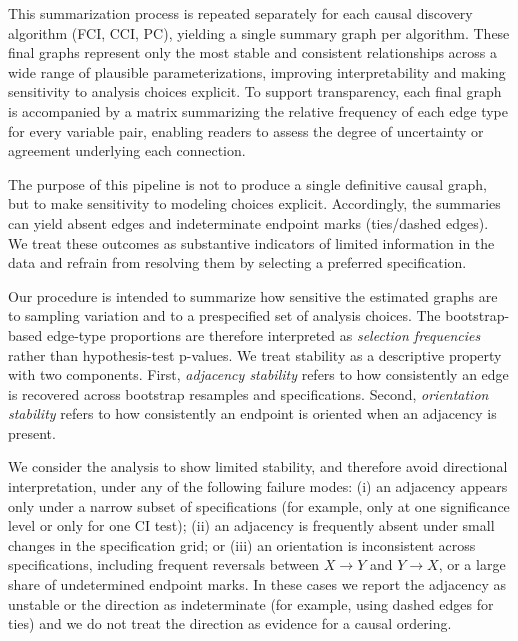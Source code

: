 \documentclass[
]{article}
\begin{document}
This summarization process is repeated separately for each causal
discovery algorithm (FCI, CCI, PC),
\textcolor{BrickRed}{yielding a single summary graph per algorithm. These final graphs represent only the most stable and consistent relationships across a wide range of plausible parameterizations, improving interpretability and making sensitivity to analysis choices explicit.}
To support transparency, each final graph is accompanied by a matrix
summarizing the relative frequency of each edge type for every variable
pair, enabling readers to assess the degree of uncertainty or agreement
underlying each connection.

\textcolor{BrickRed}{The purpose of this pipeline is not to produce a single definitive causal graph, but to make sensitivity to modeling choices explicit. Accordingly, the summaries can yield absent edges and indeterminate endpoint marks (ties/dashed edges). We treat these outcomes as substantive indicators of limited information in the data and refrain from resolving them by selecting a preferred specification.}

\textcolor{BrickRed}{Our procedure is intended to summarize how sensitive the estimated graphs are to sampling variation and to a prespecified set of analysis choices. The bootstrap-based edge-type proportions are therefore interpreted as \emph{selection frequencies} rather than hypothesis-test p-values. We treat stability as a descriptive property with two components. First, \emph{adjacency stability} refers to how consistently an edge is recovered across bootstrap resamples and specifications. Second, \emph{orientation stability} refers to how consistently an endpoint is oriented when an adjacency is present.}

\textcolor{BrickRed}{We consider the analysis to show limited stability, and therefore avoid directional interpretation, under any of the following failure modes: (i) an adjacency appears only under a narrow subset of specifications (for example, only at one significance level or only for one CI test); (ii) an adjacency is frequently absent under small changes in the specification grid; or (iii) an orientation is inconsistent across specifications, including frequent reversals between $X \rightarrow Y$ and $Y \rightarrow X$, or a large share of undetermined endpoint marks. In these cases we report the adjacency as unstable or the direction as indeterminate (for example, using dashed edges for ties) and we do not treat the direction as evidence for a causal ordering.}
\end{document}
